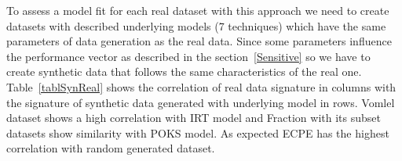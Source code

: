 To assess a model fit for each real dataset with this approach we need to create datasets with described underlying models (7 techniques) which have the same parameters of data generation as the real data. Since some parameters influence the performance vector as described in the section~\ref{Sensitive} so we have to create synthetic data that follows the same characteristics of the real one. Table~\ref{tablSynReal} shows the correlation of real data signature in columns with the signature of synthetic data generated with underlying model in rows. Vomlel dataset shows a high correlation with IRT model and Fraction with its subset datasets show similarity with POKS model. As expected ECPE has the highest correlation with random generated dataset.







